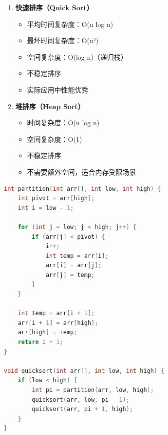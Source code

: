 \begin{enumerate}
  \item \textbf{快速排序（Quick Sort）}
    \begin{itemize}
      \item 平均时间复杂度：O(n log n)
      \item 最坏时间复杂度：O(n²)
      \item 空间复杂度：O(log n)（递归栈）
      \item 不稳定排序
      \item 实际应用中性能优秀
    \end{itemize}

  \item \textbf{堆排序（Heap Sort）}
    \begin{itemize}
      \item 时间复杂度：O(n log n)
      \item 空间复杂度：O(1)
      \item 不稳定排序
      \item 不需要额外空间，适合内存受限场景
    \end{itemize}
\end{enumerate}

\begin{lstlisting}[language=C, caption={快速排序实现}]
int partition(int arr[], int low, int high) {
    int pivot = arr[high];
    int i = low - 1;

    for (int j = low; j < high; j++) {
        if (arr[j] < pivot) {
            i++;
            int temp = arr[i];
            arr[i] = arr[j];
            arr[j] = temp;
        }
    }

    int temp = arr[i + 1];
    arr[i + 1] = arr[high];
    arr[high] = temp;
    return i + 1;
}

void quicksort(int arr[], int low, int high) {
    if (low < high) {
        int pi = partition(arr, low, high);
        quicksort(arr, low, pi - 1);
        quicksort(arr, pi + 1, high);
    }
}
\end{lstlisting}

